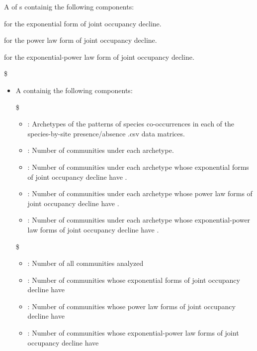 \documentclass[a4paper]{book}
\begin{document}
\begin{Value}
A  of s containig the following components:
\begin{ldescription}
\item[\code{\code{rsq.ex}}]  for the exponential form of joint occupancy decline.
\item[\code{\code{rsq.pl}}]  for the power law form of joint occupancy decline.
\item[\code{\code{rsq.ex.pl}}]  for the exponential-power law form of joint occupancy decline.
\end{ldescription}
\$
\begin{itemize}

\item{} A  containig the following components:

\$
\begin{itemize}

\item{} : Archetypes of the patterns of species co-occurrences in each
of the species-by-site presence/absence .csv data matrices.
\item{} : Number of communities under each archetype.
\item{} : Number of communities under each archetype whose exponential
forms of joint occupancy decline have .
\item{} : Number of communities under each archetype whose power
law forms of joint occupancy decline have .
\item{} : Number of communities under each archetype whose
exponential-power law forms of joint occupancy decline have .

\end{itemize}


\$
\begin{itemize}

\item{} : Number of all communities analyzed
\item{} : Number of communities whose exponential forms of joint occupancy
decline have 
\item{} : Number of communities whose power law forms of joint occupancy
decline have 
\item{} : Number of communities whose exponential-power law forms
of joint occupancy decline have 


\end{itemize}
\end{itemize}
\end{Value}
\end{document}
